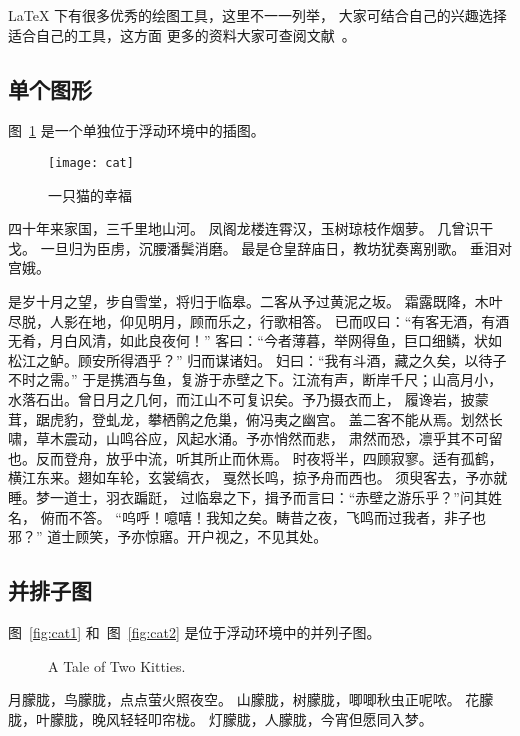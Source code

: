 \LaTeX{} 下有很多优秀的绘图工具，这里不一一列举，
大家可结合自己的兴趣选择适合自己的工具，这方面
更多的资料大家可查阅文献~。

\subsection{单个图形}

图~\ref{fig:cat} 是一个单独位于浮动环境中的插图。
\begin{figure}[!htbp]
\centering
\texttt{[image: cat]}
\caption{一只猫的幸福}\label{fig:cat}
\end{figure}

四十年来家国，三千里地山河。 凤阁龙楼连霄汉，玉树琼枝作烟萝。
几曾识干戈。 一旦归为臣虏，沉腰潘鬓消磨。
最是仓皇辞庙日，教坊犹奏离别歌。 垂泪对宫娥。

是岁十月之望，步自雪堂，将归于临皋。二客从予过黄泥之坂。
霜露既降，木叶尽脱，人影在地，仰见明月，顾而乐之，行歌相答。
已而叹曰：“有客无酒，有酒无肴，月白风清，如此良夜何！”
客曰：“今者薄暮，举网得鱼，巨口细鳞，状如松江之鲈。顾安所得酒乎？”
归而谋诸妇。 妇曰：“我有斗酒，藏之久矣，以待子不时之需。”
于是携酒与鱼，复游于赤壁之下。江流有声，断岸千尺；山高月小，
水落石出。曾日月之几何，而江山不可复识矣。予乃摄衣而上，
履谗岩，披蒙茸，踞虎豹，登虬龙，攀栖鹘之危巢，俯冯夷之幽宫。
盖二客不能从焉。划然长啸，草木震动，山鸣谷应，风起水涌。予亦悄然而悲，
肃然而恐，凛乎其不可留也。反而登舟，放乎中流，听其所止而休焉。
时夜将半，四顾寂寥。适有孤鹤，横江东来。翅如车轮，玄裳缟衣，
戛然长鸣，掠予舟而西也。 须臾客去，予亦就睡。梦一道士，羽衣蹁跹，
过临皋之下，揖予而言曰：“赤壁之游乐乎？”问其姓名， 俯而不答。
“呜呼！噫嘻！我知之矣。畴昔之夜，飞鸣而过我者，非子也邪？”
道士顾笑，予亦惊寤。开户视之，不见其处。


\subsection{并排子图}

图~\ref{fig:cat1} 和~图~\ref{fig:cat2} 是位于浮动环境中的并列子图。
\begin{figure}[!htbp]%
\centering
{}%
\qquad
{}%
\caption{A Tale of Two Kitties.}%
\end{figure}

月朦胧，鸟朦胧，点点萤火照夜空。 山朦胧，树朦胧，唧唧秋虫正呢哝。
花朦胧，叶朦胧，晚风轻轻叩帘栊。 灯朦胧，人朦胧，今宵但愿同入梦。
